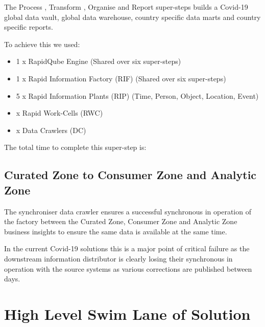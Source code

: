 The Process \cite{Vermeulen2018prc}, Transform \cite{Vermeulen2018trf}, Organise \cite{Vermeulen2018org} and Report \cite{Vermeulen2018rep} super-steps builds a Covid-19 global data vault, global data warehouse, country specific data marts and country specific reports.

To achieve this we used:
\begin{itemize}
    \item 1 x RapidQube Engine (Shared over six super-steps)
    \item 1 x Rapid Information Factory (RIF) (Shared over six super-steps)
    \item 5 x Rapid Information Plants (RIP) (Time, Person, Object, Location, Event)
    \item {\color{red}{??}} x Rapid Work-Cells (RWC)
    \item {\color{red}{??}} x Data Crawlers (DC)
\end{itemize}

The total time to complete this super-step is: {\color{red}{??}}


\subsection{Curated Zone to Consumer Zone and Analytic Zone}

The synchroniser data crawler ensures a successful synchronous in operation of the factory between the Curated Zone, Consumer Zone and Analytic Zone business insights to ensure the same data is available at the same time.

In the current Covid-19 solutions this is a major point of critical failure as the downstream information distributor is clearly losing their synchronous in operation with the source systems as various corrections are published between days.

\section{High Level Swim Lane of Solution}

{\color{red}{AFV: Need a swimlane plus solution steps}}

